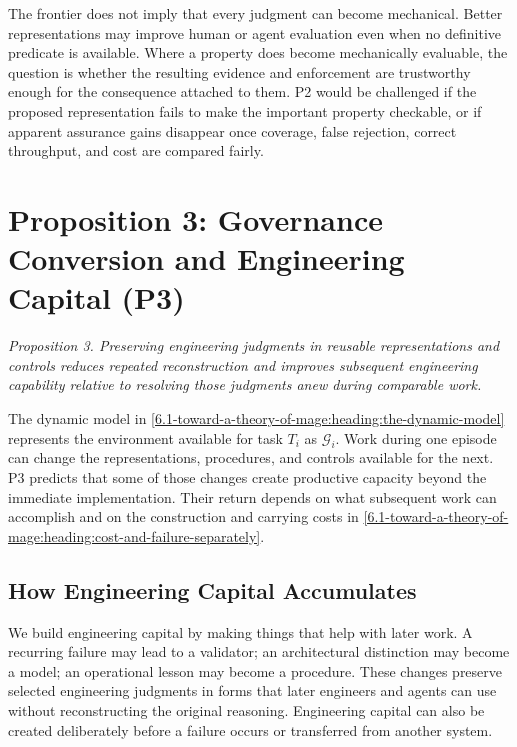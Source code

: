 The frontier does not imply that every judgment can become mechanical. Better representations may improve human or agent evaluation even when no definitive predicate is available. Where a property does become mechanically evaluable, the question is whether the resulting evidence and enforcement are trustworthy enough for the consequence attached to them. P2 would be challenged if the proposed representation fails to make the important property checkable, or if apparent assurance gains disappear once coverage, false rejection, correct throughput, and cost are compared fairly.

\section{Proposition 3: Governance Conversion and Engineering Capital (P3)}\label{heading:p3-governance-conversion-and-engineering-capital}


\emph{Proposition 3. Preserving engineering judgments in reusable representations and controls reduces repeated reconstruction and improves subsequent engineering capability relative to resolving those judgments anew during comparable work.}

The dynamic model in \autoref{6.1-toward-a-theory-of-mage:heading:the-dynamic-model} represents the environment available for task \(T_i\) as \(\mathcal{G}_i\). Work during one episode can change the representations, procedures, and controls available for the next. P3 predicts that some of those changes create productive capacity beyond the immediate implementation. Their return depends on what subsequent work can accomplish and on the construction and carrying costs in \autoref{6.1-toward-a-theory-of-mage:heading:cost-and-failure-separately}.

\subsection{How Engineering Capital Accumulates}\label{heading:how-engineering-capital-accumulates}

We build engineering capital by making things that help with later work. A recurring failure may lead to a validator; an architectural distinction may become a model; an operational lesson may become a procedure. These changes preserve selected engineering judgments in forms that later engineers and agents can use without reconstructing the original reasoning. Engineering capital can also be created deliberately before a failure occurs or transferred from another system.

